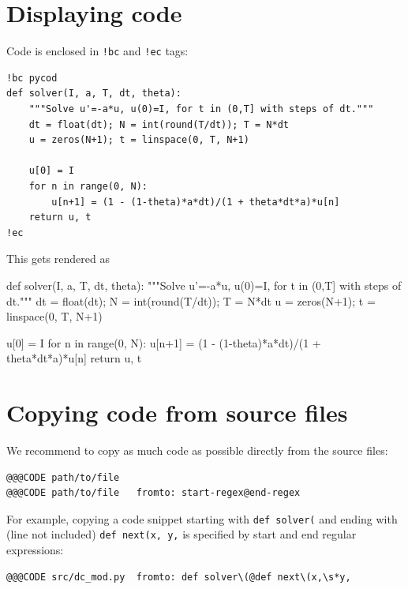 \documentclass[%
twoside,                 %
final,                   %
chapterprefix=true,      %
open=right               %
10pt]{book}
\begin{document}
\section*{Displaying code}

Code is enclosed in \Verb~!bc~ and \Verb~!ec~ tags:

\begin{Verbatim}[numbers=none,fontsize=\fontsize{9pt}{9pt},baselinestretch=0.95]
!bc pycod
def solver(I, a, T, dt, theta):
    """Solve u'=-a*u, u(0)=I, for t in (0,T] with steps of dt."""
    dt = float(dt); N = int(round(T/dt)); T = N*dt
    u = zeros(N+1); t = linspace(0, T, N+1)

    u[0] = I
    for n in range(0, N):
        u[n+1] = (1 - (1-theta)*a*dt)/(1 + theta*dt*a)*u[n]
    return u, t
!ec
\end{Verbatim}
This gets rendered as

\begin{python:nt}
def solver(I, a, T, dt, theta):
    """Solve u'=-a*u, u(0)=I, for t in (0,T] with steps of dt."""
    dt = float(dt); N = int(round(T/dt)); T = N*dt
    u = zeros(N+1); t = linspace(0, T, N+1)

    u[0] = I
    for n in range(0, N):
        u[n+1] = (1 - (1-theta)*a*dt)/(1 + theta*dt*a)*u[n]
    return u, t
\end{python:nt}



\section*{Copying code from source files}

We recommend to copy as much code as possible directly from the
source files:

\begin{Verbatim}[numbers=none,fontsize=\fontsize{9pt}{9pt},baselinestretch=0.95]
@@@CODE path/to/file
@@@CODE path/to/file   fromto: start-regex@end-regex
\end{Verbatim}
For example, copying a code snippet starting with \Verb!def solver(! and
ending with (line not included) \Verb!def next(x, y,! is specified by
start and end regular expressions:

\begin{Verbatim}[numbers=none,fontsize=\fontsize{9pt}{9pt},baselinestretch=0.95]
@@@CODE src/dc_mod.py  fromto: def solver\(@def next\(x,\s*y,
\end{Verbatim}

\end{document}
